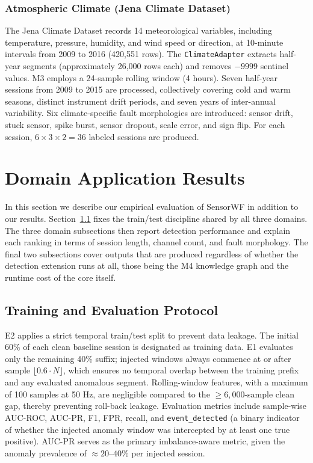 \documentclass[conference]{IEEEtran}
\begin{document}
\subsubsection{Atmospheric Climate (Jena Climate Dataset)}

The Jena Climate Dataset \cite{jena_climate} records 14 meteorological variables, including temperature, pressure, humidity, and wind speed or direction, at 10-minute intervals from 2009 to 2016 (420,551 rows). The \texttt{ClimateAdapter} extracts half-year segments (approximately 26,000 rows each) and removes $-9999$ sentinel values. M3 employs a 24-sample rolling window (4 hours). Seven half-year sessions from 2009 to 2015 are processed, collectively covering cold and warm seasons, distinct instrument drift periods, and seven years of inter-annual variability. Six climate-specific fault morphologies are introduced: sensor drift, stuck sensor, spike burst, sensor dropout, scale error, and sign flip. For each session, $6 \times 3 \times 2 = 36$ labeled sessions are produced.



\section{Domain Application Results}

In this section we describe our empirical evaluation of SensorWF in addition to our results. Section~\ref{sec:protocol} fixes the train/test discipline shared by all three domains. The three domain subsections then report detection performance and explain each ranking in terms of session length, channel count, and fault morphology. The final two subsections cover outputs that are produced regardless of whether the detection extension runs at all, those being the M4 knowledge graph and the runtime cost of the core itself.

\subsection{Training and Evaluation Protocol}
\label{sec:protocol}

E2 applies a strict temporal train/test split to prevent data leakage. The initial 60\% of each clean baseline session is designated as training data. E1 evaluates only the remaining 40\% suffix; injected windows always commence at or after sample $\lfloor 0.6 \cdot N \rfloor$, which ensures no temporal overlap between the training prefix and any evaluated anomalous segment. Rolling-window features, with a maximum of 100 samples at 50 Hz, are negligible compared to the $\geq\!6{,}000$-sample clean gap, thereby preventing roll-back leakage. Evaluation metrics include sample-wise AUC-ROC, AUC-PR, F1, FPR, recall, and \texttt{event\_detected} (a binary indicator of whether the injected anomaly window was intercepted by at least one true positive). AUC-PR serves as the primary imbalance-aware metric, given the anomaly prevalence of $\approx\!20$--$40\%$ per injected session.
\end{document}
